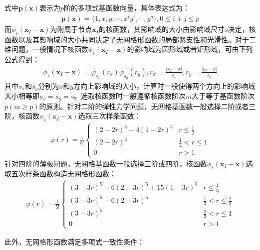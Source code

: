 式中$\pmb{p}(\pmb{x})$表示为$p$阶的多项式基函数向量，具体表达式为：
\begin{equation}
\begin{split}
    \pmb{p}(\pmb{x})=\{1,x,y,\dotsb,x^iy^i,\dotsb,y^p\},0\le i+j \le p
\end{split}
\end{equation}
而$\phi_s(\pmb{x}_I-\pmb{x})$为附属于节点$\pmb{x}_I$的核函数，其影响域的大小由影响域尺寸$s$决定，核函数以及其影响域的大小共同决定了无网格形函数的局部紧支性和光滑性。对于二维问题，一般情况下核函数$\phi_s(\pmb{x}_I-\pmb{x})$的影响域为圆形域或者矩形域，可由下列公式得到：
\begin{equation}
\begin{split}
    \phi_s(\pmb{x}_I-\pmb{x})=\varphi_{s_x}(r_x)\varphi_{s_y}(r_y),r_x=\frac{\lvert x_I-x\rvert}{s_x},r_y=\frac{\lvert y_I-y \rvert}{s_y}
\end{split}
\end{equation}
其中$s_x$和$s_y$分别为$x$和$y$方向上影响域的大小，计算时一般使得两个方向上的影响域大小相等即$s_x=s_y=s$。选取核函数时一般遵循核函数阶次$m$大于等于基函数阶次$p(m\ge p)$的原则。针对二阶的弹性力学问题，无网格基函数一般选择二阶或者三阶，核函数$\phi_s(\pmb{x}_I-\pmb{x})$选取三次样条函数：
\begin{equation}
\begin{split}
    \varphi(r)=\frac{1}{3!}
\begin{cases}
    (2-2r)^3-4(1-2r)^3 &r\le \frac{1}{2}\\
    (2-2r)^3&\frac{1}{2}<r\le 1\\
    0&r>1
\end{cases}
\end{split}
\end{equation}
针对四阶的薄板问题，无网格基函数一般选择三阶或四阶，核函数$\phi_s(\pmb{x}_I-\pmb{x})$选取五次样条函数构造无网格形函数：
\begin{equation}
\begin{split}
        \varphi(r)=\frac{1}{5!}
\begin{cases}
        (3-3r)^5-6(2-3r)^5+15(1-3r)^5&r\le\frac{1}{3}\\
        (3-3r)^5-6(2-3r)^5&\frac{1}{3}<r\le\frac{2}{3}\\
        (3-3r)^5&\frac{2}{3}<r\le1\\
        0&r>1
\end{cases}
\end{split}
\end{equation}\par
此外，无网格形函数满足多项式一致性条件：
